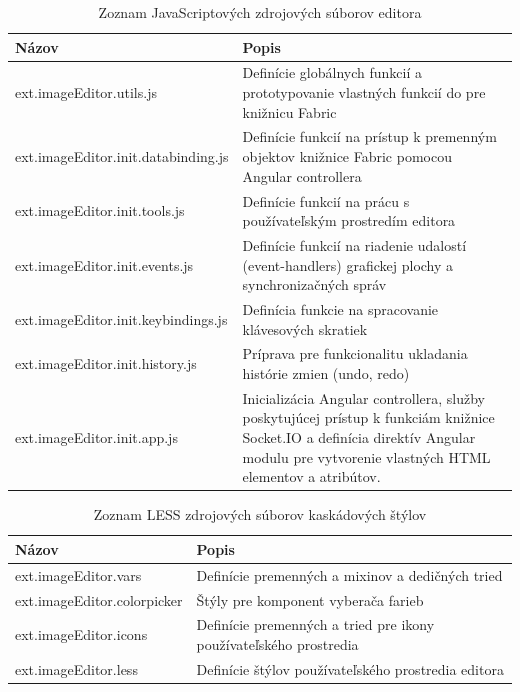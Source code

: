 \begin{table}
	\begin{tabular}{ | m{6cm} | m{6.5cm} | } \hline
		\textbf{Názov} & \textbf{Popis} \\ \hline \hline
		
		ext.imageEditor.utils.js & Definície globálnych funkcií a prototypovanie vlastných funkcií do pre knižnicu Fabric \\\hline
		ext.imageEditor.init.databinding.js & Definície funkcií na prístup k premenným objektov knižnice Fabric pomocou Angular controllera \\\hline
		ext.imageEditor.init.tools.js & Definície funkcií na prácu s používateľským prostredím editora \\\hline
		ext.imageEditor.init.events.js & Definície funkcií na riadenie udalostí (event-handlers) grafickej plochy a synchronizačných správ \\\hline
		ext.imageEditor.init.keybindings.js & Definícia funkcie na spracovanie klávesových skratiek \\\hline
		ext.imageEditor.init.history.js & Príprava pre funkcionalitu ukladania histórie zmien (undo, redo) \\\hline
		ext.imageEditor.init.app.js & Inicializácia Angular controllera, služby poskytujúcej prístup k funkciám knižnice Socket.IO a definícia direktív Angular modulu pre vytvorenie vlastných HTML elementov a atribútov. \\\hline
		
		\hline
	\end{tabular}
	\caption{Zoznam JavaScriptových zdrojových súborov editora}
	\label{tab:editor-scripts-files}
\end{table}

\begin{table}
	\begin{tabular}{ | m{6cm} | m{6.5cm} | } \hline
		\textbf{Názov} & \textbf{Popis} \\ \hline \hline
		
		ext.imageEditor.vars & Definície premenných a mixinov a dedičných tried \\\hline
		ext.imageEditor.colorpicker & Štýly pre komponent vyberača farieb \\\hline
		ext.imageEditor.icons & Definície premenných a tried pre ikony používateľského prostredia \\\hline
		ext.imageEditor.less & Definície štýlov používateľského prostredia editora \\\hline
		
		\hline
	\end{tabular}
	\caption{Zoznam LESS zdrojových súborov kaskádových štýlov}
	\label{tab:editor-styles-files}
\end{table}

